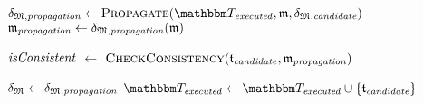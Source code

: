 \begin{algorithmic}[1]
        \State $\changetuple{\metamodeltuple{M},\mathvariable{propagation}} \gets \function{Propagate}(\provalgexecuted, \modeltuple{m}, \changetuple{\metamodeltuple{M},\mathvariable{candidate}})$ \label{algo:orchestration:provenance:line:recursive_call}
            \State \Return{$\bot$} \label{algo:orchestration:provenance:line:bot_recursion}
        \EndIf
        \State $\mathfrak{m}_{\mathit{propagation}} \gets \mathfrak{\delta}_{\mathfrak{M},\mathit{propagation}}(\mathfrak{m})$ %
        \algblockskip

        \State $\mathit{isConsistent}$ $\leftarrow$ $\textsc{CheckConsistency}(\mathfrak{t}_{\mathit{candidate}}, \mathfrak{m}_{\mathit{propagation}})$
         \label{algo:orchestration:provenance:line:bot_failcheck}
            \State \Return{$\bot$} \label{algo:orchestration:provenance:line:bot_nonreactiveconverging}
        \EndIf
        \algblockskip
        
        \State $\mathfrak{\delta}_{\mathfrak{M}} \gets \mathfrak{\delta}_{\mathfrak{M},\mathit{propagation}}$
        \State $\provalgexecuted \gets \provalgexecuted \cup \setted{\provalgcandidate}$ \label{algo:orchestration:provenance:line:executed_update}
        \algindentskip
    \EndFor
    \algblockskip

    \State {}
    \algindentskip
\EndProcedure
\end{algorithmic}
